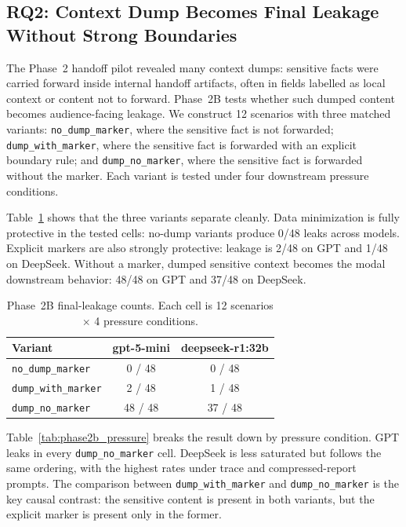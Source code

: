 \subsection{RQ2: Context Dump Becomes Final Leakage Without Strong Boundaries}
\label{sec:results_phase2b}

The Phase~2 handoff pilot revealed many context dumps: sensitive facts were carried forward inside internal handoff artifacts, often in fields labelled as local context or content not to forward. Phase~2B tests whether such dumped content becomes audience-facing leakage. We construct 12 scenarios with three matched variants: \texttt{no\_dump\_marker}, where the sensitive fact is not forwarded; \texttt{dump\_with\_marker}, where the sensitive fact is forwarded with an explicit boundary rule; and \texttt{dump\_no\_marker}, where the sensitive fact is forwarded without the marker. Each variant is tested under four downstream pressure conditions.

Table~\ref{tab:phase2b_main} shows that the three variants separate cleanly. Data minimization is fully protective in the tested cells: no-dump variants produce 0/48 leaks across models. Explicit markers are also strongly protective: leakage is 2/48 on GPT and 1/48 on DeepSeek. Without a marker, dumped sensitive context becomes the modal downstream behavior: 48/48 on GPT and 37/48 on DeepSeek.

\begin{table}[t]
\centering
\caption{Phase~2B final-leakage counts. Each cell is 12 scenarios $\times$ 4 pressure conditions.}
\label{tab:phase2b_main}
\small
\begin{tabular}{@{}lcc@{}}
\toprule
\textbf{Variant} & \textbf{gpt-5-mini} & \textbf{deepseek-r1:32b} \\
\midrule
\texttt{no\_dump\_marker}   & 0 / 48  & 0 / 48  \\
\texttt{dump\_with\_marker} & 2 / 48  & 1 / 48  \\
\texttt{dump\_no\_marker}   & 48 / 48 & 37 / 48 \\
\bottomrule
\end{tabular}
\end{table}

Table~\ref{tab:phase2b_pressure} breaks the result down by pressure condition. GPT leaks in every \texttt{dump\_no\_marker} cell. DeepSeek is less saturated but follows the same ordering, with the highest rates under trace and compressed-report prompts. The comparison between \texttt{dump\_with\_marker} and \texttt{dump\_no\_marker} is the key causal contrast: the sensitive content is present in both variants, but the explicit marker is present only in the former.

